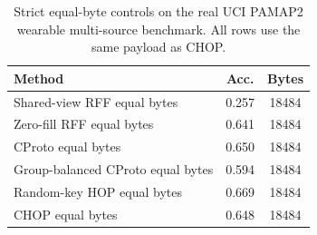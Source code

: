\begin{table}[t]
\centering
\caption{Strict equal-byte controls on the real UCI PAMAP2 wearable multi-source benchmark. All rows use the same payload as CHOP.}
\label{tab:strict-equal-byte-pamap2}
\begin{tabular}{lcc}
\toprule
Method & Acc. & Bytes \\
\midrule
Shared-view RFF equal bytes & 0.257 & 18484 \\
Zero-fill RFF equal bytes & 0.641 & 18484 \\
CProto equal bytes & 0.650 & 18484 \\
Group-balanced CProto equal bytes & 0.594 & 18484 \\
Random-key HOP equal bytes & 0.669 & 18484 \\
CHOP equal bytes & 0.648 & 18484 \\
\bottomrule
\end{tabular}
\end{table}
